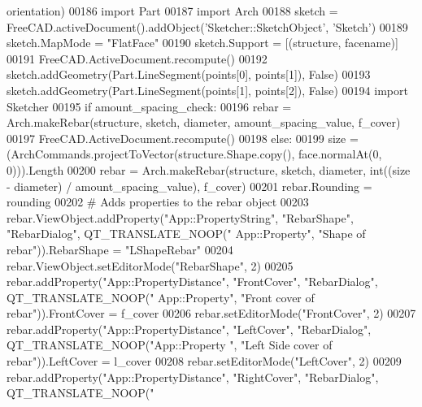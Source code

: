 \begin{DoxyCode}
      orientation)
00186     \textcolor{keyword}{import} Part
00187     \textcolor{keyword}{import} Arch
00188     sketch = FreeCAD.activeDocument().addObject(\textcolor{stringliteral}{'Sketcher::SketchObject'}, \textcolor{stringliteral}{'Sketch'})
00189     sketch.MapMode = \textcolor{stringliteral}{"FlatFace"}
00190     sketch.Support = [(structure, facename)]
00191     FreeCAD.ActiveDocument.recompute()
00192     sketch.addGeometry(Part.LineSegment(points[0], points[1]), \textcolor{keyword}{False})
00193     sketch.addGeometry(Part.LineSegment(points[1], points[2]), \textcolor{keyword}{False})
00194     \textcolor{keyword}{import} Sketcher
00195     \textcolor{keywordflow}{if} amount\_spacing\_check:
00196         rebar = Arch.makeRebar(structure, sketch, diameter, amount\_spacing\_value, f\_cover)
00197         FreeCAD.ActiveDocument.recompute()
00198     \textcolor{keywordflow}{else}:
00199         size = (ArchCommands.projectToVector(structure.Shape.copy(), face.normalAt(0, 0))).Length
00200         rebar = Arch.makeRebar(structure, sketch, diameter, int((size - diameter) / amount\_spacing\_value), 
      f\_cover)
00201     rebar.Rounding = rounding
00202     \textcolor{comment}{# Adds properties to the rebar object}
00203     rebar.ViewObject.addProperty(\textcolor{stringliteral}{"App::PropertyString"}, \textcolor{stringliteral}{"RebarShape"}, \textcolor{stringliteral}{"RebarDialog"}, QT\_TRANSLATE\_NOOP(\textcolor{stringliteral}{"
      App::Property"}, \textcolor{stringliteral}{"Shape of rebar"})).RebarShape = \textcolor{stringliteral}{"LShapeRebar"}
00204     rebar.ViewObject.setEditorMode(\textcolor{stringliteral}{"RebarShape"}, 2)
00205     rebar.addProperty(\textcolor{stringliteral}{"App::PropertyDistance"}, \textcolor{stringliteral}{"FrontCover"}, \textcolor{stringliteral}{"RebarDialog"}, QT\_TRANSLATE\_NOOP(\textcolor{stringliteral}{"
      App::Property"}, \textcolor{stringliteral}{"Front cover of rebar"})).FrontCover = f\_cover
00206     rebar.setEditorMode(\textcolor{stringliteral}{"FrontCover"}, 2)
00207     rebar.addProperty(\textcolor{stringliteral}{"App::PropertyDistance"}, \textcolor{stringliteral}{"LeftCover"}, \textcolor{stringliteral}{"RebarDialog"}, QT\_TRANSLATE\_NOOP(\textcolor{stringliteral}{"App::Property
      "}, \textcolor{stringliteral}{"Left Side cover of rebar"})).LeftCover = l\_cover
00208     rebar.setEditorMode(\textcolor{stringliteral}{"LeftCover"}, 2)
00209     rebar.addProperty(\textcolor{stringliteral}{"App::PropertyDistance"}, \textcolor{stringliteral}{"RightCover"}, \textcolor{stringliteral}{"RebarDialog"}, QT\_TRANSLATE\_NOOP(\textcolor{stringliteral}{"
}
\end{DoxyCode}
